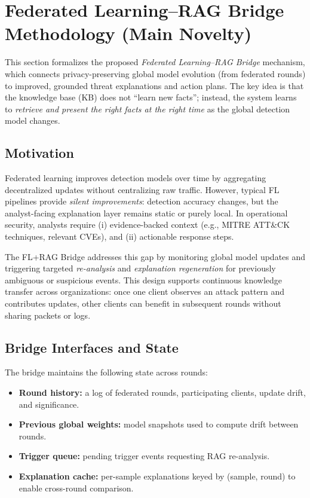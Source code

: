 
\section{Federated Learning--RAG Bridge Methodology (Main Novelty)}
\label{sec:fl-rag-bridge-methods}

This section formalizes the proposed \emph{Federated Learning--RAG Bridge} mechanism, which connects privacy-preserving global model evolution (from federated rounds) to improved, grounded threat explanations and action plans. The key idea is that the knowledge base (KB) does not ``learn new facts''; instead, the system learns to \emph{retrieve and present the right facts at the right time} as the global detection model changes.

\subsection{Motivation}
Federated learning improves detection models over time by aggregating decentralized updates without centralizing raw traffic. However, typical FL pipelines provide \emph{silent improvements}: detection accuracy changes, but the analyst-facing explanation layer remains static or purely local. In operational security, analysts require (i) evidence-backed context (e.g., MITRE ATT\&CK techniques, relevant CVEs), and (ii) actionable response steps.

The FL+RAG Bridge addresses this gap by monitoring global model updates and triggering targeted \emph{re-analysis} and \emph{explanation regeneration} for previously ambiguous or suspicious events. This design supports continuous knowledge transfer across organizations: once one client observes an attack pattern and contributes updates, other clients can benefit in subsequent rounds without sharing packets or logs.

\subsection{Bridge Interfaces and State}
\label{sec:bridge-interfaces}

The bridge maintains the following state across rounds:
\begin{itemize}
  \item \textbf{Round history:} a log of federated rounds, participating clients, update drift, and significance.
  \item \textbf{Previous global weights:} model snapshots used to compute drift between rounds.
  \item \textbf{Trigger queue:} pending trigger events requesting RAG re-analysis.
  \item \textbf{Explanation cache:} per-sample explanations keyed by (sample, round) to enable cross-round comparison.
\end{itemize}

